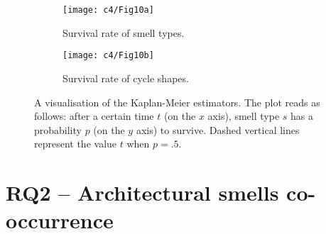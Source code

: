 \begin{figure}
    \begin{subfigure}[b]{0.49\textwidth}
        \centering
        \texttt{[image: c4/Fig10a]}
        \caption{Survival rate of smell types.}\label{c4:fig:survival-smells}
    \end{subfigure}
    \hfill
    \begin{subfigure}[b]{0.49\textwidth}
        \centering
        \texttt{[image: c4/Fig10b]}
        \caption{Survival rate of cycle shapes.}\label{c4:fig:survival-shapes}
    \end{subfigure}
    \caption{A visualisation of the Kaplan-Meier estimators. The plot reads as follows: after a certain time $t$ (on the $x$ axis), smell type $s$ has a probability $p$ (on the $y$ axis) to survive. Dashed vertical lines represent the value $t$ when $p = .5$.}
    \label{c4:fig:survival-analysis}
\end{figure}


\section{RQ2 -- Architectural smells co-occurrence}\label{c4:sec:rq2}
